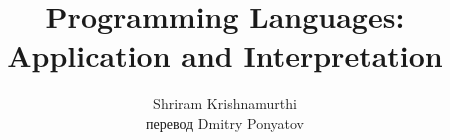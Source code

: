
\title{Programming Languages: Application and Interpretation}
\author{Shriram Krishnamurthi\\перевод Dmitry Ponyatov }

\maketitle
\tableofcontents

